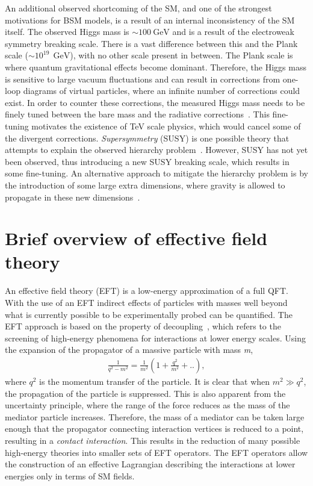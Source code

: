 An additional observed shortcoming of the SM, and one of the strongest motivations for BSM models, is a result of an internal inconsistency of the SM itself. The observed Higgs mass is $\sim \SI{100}{\giga\electronvolt}$ and is a result of the electroweak symmetry breaking scale. There is a vast difference between this and the Plank scale ($\sim 10^{19}~\SI{}{\giga\electronvolt}$), with no other scale present in between. The Plank scale is where quantum gravitational effects become dominant. Therefore, the Higgs mass is sensitive to large vacuum fluctuations and can result in corrections from one-loop diagrams of virtual particles, where an infinite number of corrections could exist. In order to counter these corrections, the measured Higgs mass needs to be finely tuned between the bare mass and the radiative corrections~\cite{Giudice_2008}. This fine-tuning motivates the existence of TeV scale physics, which would cancel some of the divergent corrections. \emph{Supersymmetry} (SUSY) is one possible theory that attempts to explain the observed hierarchy problem~\cite{MARTIN_1998}. However, SUSY has not yet been observed, thus introducing a new SUSY breaking scale, which results in some fine-tuning. An alternative approach to mitigate the hierarchy problem is by the introduction of some large extra dimensions, where gravity is allowed to propagate in these new dimensions~\cite{Arkani_Hamed_1998}. 

\section{Brief overview of effective field theory}\label{sec:bsm:eft}
An effective field theory (EFT) is a low-energy approximation of a full QFT. With the use of an EFT indirect effects of particles with masses well beyond what is currently possible to be experimentally probed can be quantified. The EFT approach is based on the property of decoupling~\cite{Manohar:2018aog}, which refers to the screening of high-energy phenomena for interactions at lower energy scales. Using the expansion of the propagator of a massive particle with mass \emph{m}, 
\begin{equation}
    \label{eq:propogator}
    \begin{aligned}
        \frac{1}{q^2 - m^2} = \frac{1}{m^2}(1 + \frac{q^2}{m^2} + ..),
     \end{aligned}
\end{equation}
where $q^2$ is the momentum transfer of the particle. It is clear that when $m^2 \gg q^2$, the propagation of the particle is suppressed. This is also apparent from the uncertainty principle, where the range of the force reduces as the mass of the mediator particle increases. Therefore, the mass of a mediator can be taken large enough that the propagator connecting interaction vertices is reduced to a point, resulting in a \emph{contact interaction}. This results in the reduction of many possible high-energy theories into smaller sets of EFT operators. The EFT operators allow the construction of an effective Lagrangian describing the interactions at lower energies only in terms of SM fields. 

